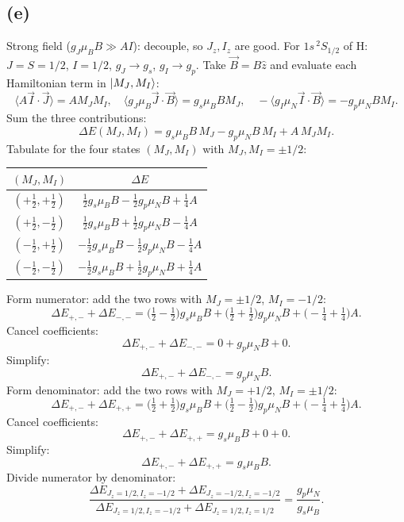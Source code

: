 \documentclass[11pt]{article}
\begin{document}
\subsection*{(e)}

Strong field ($g_J\mu_B B\gg A I$): decouple, so $J_z,I_z$ are good. For $1s\,{}^2S_{1/2}$ of H: $J=S=1/2$, $I=1/2$, $g_J\to g_s$, $g_I\to g_p$. Take $\vec B=B\hat z$ and evaluate each Hamiltonian term in $\ket{M_J,M_I}$:
\[
\langle A\vec I\cdot\vec J\rangle=A M_J M_I,\quad \langle g_J\mu_B\vec J\cdot\vec B\rangle=g_s\mu_B B M_J,\quad -\langle g_I\mu_N\vec I\cdot\vec B\rangle=-g_p\mu_N B M_I.
\]
Sum the three contributions:
\[
\Delta E(M_J,M_I)=g_s\mu_B B\,M_J-g_p\mu_N B\,M_I+A\,M_J M_I.
\]
Tabulate for the four states $(M_J,M_I)$ with $M_J,M_I=\pm 1/2$:
\begin{center}
\begin{tabular}{@{}cc@{}}\toprule
$(M_J,M_I)$ & $\Delta E$ \\ \midrule
$(+\tfrac12,+\tfrac12)$ & $\tfrac12 g_s\mu_B B-\tfrac12 g_p\mu_N B+\tfrac14 A$ \\
$(+\tfrac12,-\tfrac12)$ & $\tfrac12 g_s\mu_B B+\tfrac12 g_p\mu_N B-\tfrac14 A$ \\
$(-\tfrac12,+\tfrac12)$ & $-\tfrac12 g_s\mu_B B-\tfrac12 g_p\mu_N B-\tfrac14 A$ \\
$(-\tfrac12,-\tfrac12)$ & $-\tfrac12 g_s\mu_B B+\tfrac12 g_p\mu_N B+\tfrac14 A$ \\
\bottomrule
\end{tabular}
\end{center}
Form numerator: add the two rows with $M_J=\pm 1/2$, $M_I=-1/2$:
\[
\Delta E_{+,-}+\Delta E_{-,-}=\bigl(\tfrac12-\tfrac12\bigr)g_s\mu_B B+\bigl(\tfrac12+\tfrac12\bigr)g_p\mu_N B+\bigl(-\tfrac14+\tfrac14\bigr)A.
\]
Cancel coefficients:
\[
\Delta E_{+,-}+\Delta E_{-,-}=0+g_p\mu_N B+0.
\]
Simplify:
\[
\Delta E_{+,-}+\Delta E_{-,-}=g_p\mu_N B.
\]
Form denominator: add the two rows with $M_J=+1/2$, $M_I=\pm 1/2$:
\[
\Delta E_{+,-}+\Delta E_{+,+}=\bigl(\tfrac12+\tfrac12\bigr)g_s\mu_B B+\bigl(\tfrac12-\tfrac12\bigr)g_p\mu_N B+\bigl(-\tfrac14+\tfrac14\bigr)A.
\]
Cancel coefficients:
\[
\Delta E_{+,-}+\Delta E_{+,+}=g_s\mu_B B+0+0.
\]
Simplify:
\[
\Delta E_{+,-}+\Delta E_{+,+}=g_s\mu_B B.
\]
Divide numerator by denominator:
\[
\boxed{\;\frac{\Delta E_{J_z=1/2,I_z=-1/2}+\Delta E_{J_z=-1/2,I_z=-1/2}}{\Delta E_{J_z=1/2,I_z=-1/2}+\Delta E_{J_z=1/2,I_z=1/2}}=\frac{g_p\mu_N}{g_s\mu_B}.\;}
\]

\end{document}
